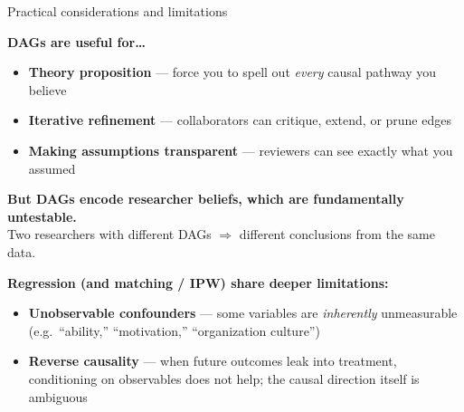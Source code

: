 \documentclass[aspectratio=169, 12pt]{beamer}
\newcommand{\redt}[1]{\textcolor{emphred}{#1}}
\begin{document}
\begin{frame}{Practical considerations and limitations}

\textbf{DAGs are useful for\ldots}
\begin{itemize}\setlength\itemsep{0.15em}
  \item \textbf{Theory proposition} --- force you to spell out \emph{every} causal pathway you believe
  \item \textbf{Iterative refinement} --- collaborators can critique, extend, or prune edges
  \item \textbf{Making assumptions transparent} --- reviewers can see exactly what you assumed
\end{itemize}

\vspace{0.5em}
\textbf{But DAGs encode \redt{researcher beliefs}, which are fundamentally untestable.}\\[0.2em]
Two researchers with different DAGs $\Rightarrow$ different conclusions from the same data.

\vspace{0.5em}
\textbf{Regression (and matching / IPW) share deeper limitations:}
\begin{itemize}\setlength\itemsep{0.15em}
  \item \textbf{Unobservable confounders} --- some variables are \emph{inherently} unmeasurable
    (e.g.\ ``ability,'' ``motivation,'' ``organization culture'')
  \item \textbf{Reverse causality} --- when future outcomes leak into treatment,
    conditioning on observables does not help;
    the causal direction itself is ambiguous
\end{itemize}
\end{frame}
\end{document}
